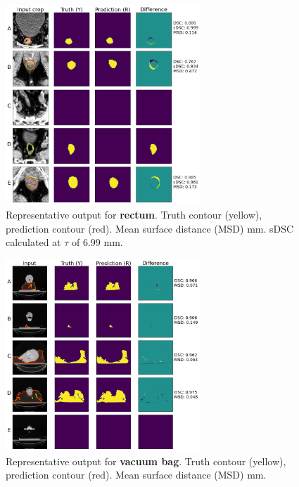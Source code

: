 \documentclass[9pt]{beamer}
\begin{document}
%
\begin{frame}
\begin{figure}
\includegraphics[width=0.65\textwidth]{images/prostate_rectum}
\caption{Representative output for \textbf{rectum}. Truth contour (yellow), prediction contour (red). Mean surface distance (MSD) mm. sDSC calculated at $\tau$ of 6.99 mm.\footnotemark[2]}
\end{figure}
\end{frame}
%
% 
%
\begin{frame}
\begin{figure}
\includegraphics[width=0.65\textwidth]{images/vet_vacbag}
\caption{Representative output for \textbf{vacuum bag}. Truth contour (yellow), prediction contour (red). Mean surface distance (MSD) mm.}
\end{figure}
\end{frame}
%
\end{document}
